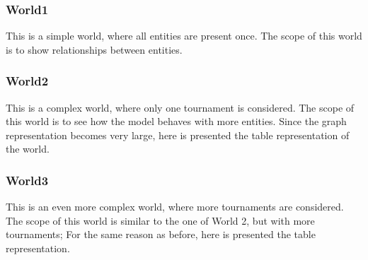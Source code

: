 \subsubsection{World1}
This is a simple world, where all entities are present once. The scope of this world is to show relationships between entities.
\clearpage
\subsubsection{World2}
This is a complex world, where only one tournament is considered. The scope of this world is to see how the model behaves with more entities. 
Since the graph representation becomes very large, here is presented the table representation of the world.

\clearpage
\subsubsection{World3}
This is an even more complex world, where more tournaments are considered. The scope of this world is similar to the one of World 2, but with more tournaments;
For the same reason as before, here is presented the table representation.

